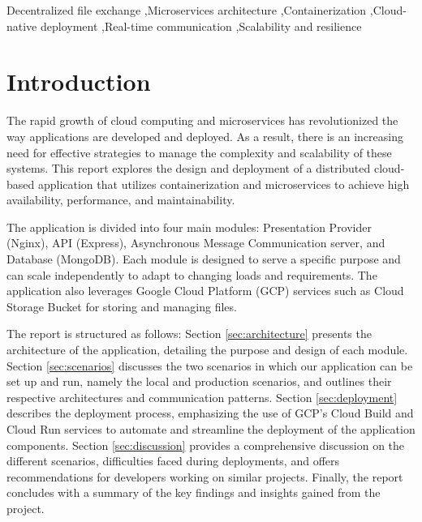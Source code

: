\documentclass[a4paper,fleqn]{cas-dc}
\begin{document}
\begin{keywords}
Decentralized file exchange \sep Microservices architecture \sep Containerization \sep Cloud-native deployment \sep Real-time communication \sep Scalability and resilience
\end{keywords}


\maketitle

\section{Introduction}

The rapid growth of cloud computing and microservices has revolutionized the way applications are developed and deployed. As a result, there is an increasing need for effective strategies to manage the complexity and scalability of these systems. This report explores the design and deployment of a distributed cloud-based application that utilizes containerization and microservices to achieve high availability, performance, and maintainability.

The application is divided into four main modules: Presentation Provider (Nginx), API (Express), Asynchronous Message Communication server, and Database (MongoDB). Each module is designed to serve a specific purpose and can scale independently to adapt to changing loads and requirements. The application also leverages Google Cloud Platform (GCP) services such as Cloud Storage Bucket for storing and managing files.

The report is structured as follows: Section \ref{sec:architecture} presents the architecture of the application, detailing the purpose and design of each module. Section \ref{sec:scenarios} discusses the two scenarios in which our application can be set up and run, namely the local and production scenarios, and outlines their respective architectures and communication patterns. Section \ref{sec:deployment} describes the deployment process, emphasizing the use of GCP's Cloud Build and Cloud Run services to automate and streamline the deployment of the application components. Section \ref{sec:discussion} provides a comprehensive discussion on the different scenarios, difficulties faced during deployments, and offers recommendations for developers working on similar projects. Finally, the report concludes with a summary of the key findings and insights gained from the project.
\end{document}
